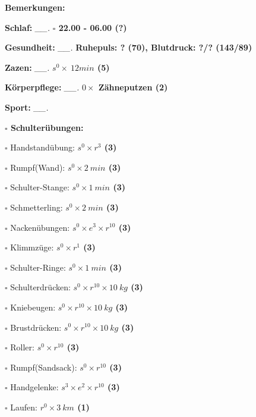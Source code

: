 \documentclass[10pt,a4paper]{article}
\newcommand\prop[1] {{\color {alizarin} {\bf #1}}}        %
\newcommand\mand[1] {{\color {burntorange} {\bf #1}}}     %
\newcommand\topspace{\vskip -15pt \hskip 20pt}
\newcommand\n[1] { {\sl #1.} \hskip 5pt }
\begin{document}
\begin{mdframed}[style=daystyle]
  \begin{labeling}{{\mand {Bemerkungen:}}}
    \setlength\itemsep{-3pt}
  \item[{\mand {Schlaf:}}]       \n{\_\_} {\prop {$\square$ 22.00 - 06.00 (?)}}
  \item[{\mand {Gesundheit:}}]   \n{\_\_} {\prop {Ruhepuls: ? (70), Blutdruck: ?/? (143/89)}}
  \item[{\mand {Zazen:}}]        \n{\_\_} {\prop {$s^0 \times\ 12 min$ (5)}}
  \item[{\mand {Körperpflege:}}] \n{\_\_} {\prop {$0 \times$ Zähneputzen (2)}}
  \item[{\mand {Sport:}}]        \n{\_\_}
    \topspace
    \begin{minipage}{0.75\textwidth}  
      \begin{labeling}{\prop {$\square$ {Schulterübungen:}}} 
        \setlength\itemsep{-3pt}
      \item[$\square$ Handstandübung:]  {\prop {$s^0 \times r^{3}$ (3)}}
      \item[$\square$ Rumpf(Wand):]     {\prop {$s^0 \times 2\ min$ (3)}}
      \item[$\square$ Schulter-Stange:] {\prop {$s^0 \times 1\ min$ (3)}}
      \item[$\square$ Schmetterling:]   {\prop {$s^0 \times 2\ min$ (3)}}
      \item[$\square$ Nackenübungen:]   {\prop {$s^0 \times e^3 \times r^{10}$ (3)}}
      \item[$\square$ Klimmzüge:]       {\prop {$s^0 \times r^1$ (3)}}
      \item[$\square$ Schulter-Ringe:]  {\prop {$s^0 \times 1\ min$ (3)}}
      \item[$\square$ Schulterdrücken:] {\prop {$s^0 \times r^{10} \times 10\ kg$ (3)}}
      \item[$\square$ Kniebeugen:]      {\prop {$s^0 \times r^{10} \times 10\ kg$ (3)}}
      \item[$\square$ Brustdrücken:]    {\prop {$s^0 \times r^{10} \times 10\ kg$ (3)}}
      \item[$\square$ Roller:]          {\prop {$s^0 \times r^{10}$ (3)}}
      \item[$\square$ Rumpf(Sandsack):] {\prop {$s^0 \times r^{10}$ (3)}}
      \item[$\square$ Handgelenke:]     {\prop {$s^3 \times e^2 \times r^{10}$ (3)}}
      \item[$\square$ Laufen:]          {\prop {$r^0 \times 3\ km$ (1)}}

\end{labeling}
\end{minipage}
\end{labeling}
\end{mdframed}
\end{document}
